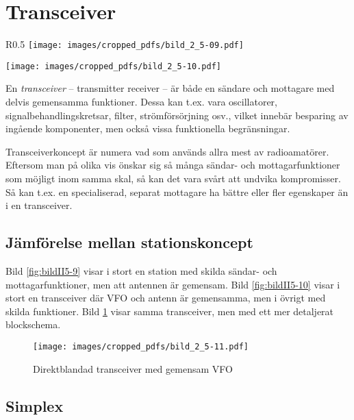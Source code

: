 \section{Transceiver}

\begin{wrapfigure}[26]{R}{0.5\textwidth}
  \texttt{[image: images/cropped\_pdfs/bild\_2\_5-09.pdf]}
  \caption{Separat sändare och mottagare}
  \label{fig:bildII5-9}

  \texttt{[image: images/cropped\_pdfs/bild\_2\_5-10.pdf]}
  \caption{Transceiver med samma VFO}
  \label{fig:bildII5-10}
\end{wrapfigure}

En \emph{transceiver} -- transmitter receiver -- är både en sändare och
mottagare med delvis gemensamma funktioner.
Dessa kan t.ex. vara oscillatorer, signalbehandlingskretsar, filter,
strömförsörjning osv., vilket innebär besparing av ingående komponenter,
men också vissa funktionella begränsningar.

Transceiverkoncept är numera vad som används allra mest av radioamatörer.
Eftersom man på olika vis önskar sig så många sändar- och mottagarfunktioner
som möjligt inom samma skal, så kan det vara svårt att undvika kompromisser.
Så kan t.ex. en specialiserad, separat mottagare ha bättre eller fler
egenskaper än i en transceiver.

\subsection{Jämförelse mellan stationskoncept}

Bild \ref{fig:bildII5-9} visar i stort en station med skilda sändar- och
mottagarfunktioner, men att antennen är gemensam.
Bild \ref{fig:bildII5-10} visar i stort en transceiver där VFO och antenn är
gemensamma, men i övrigt med skilda funktioner.
Bild \ref{fig:bildII5-11} visar samma transceiver, men med ett mer detaljerat
blockschema.

\begin{figure}
  \texttt{[image: images/cropped\_pdfs/bild\_2\_5-11.pdf]}
  \caption{Direktblandad transceiver med gemensam VFO}
  \label{fig:bildII5-11}
\end{figure}

\subsection{Simplex}

